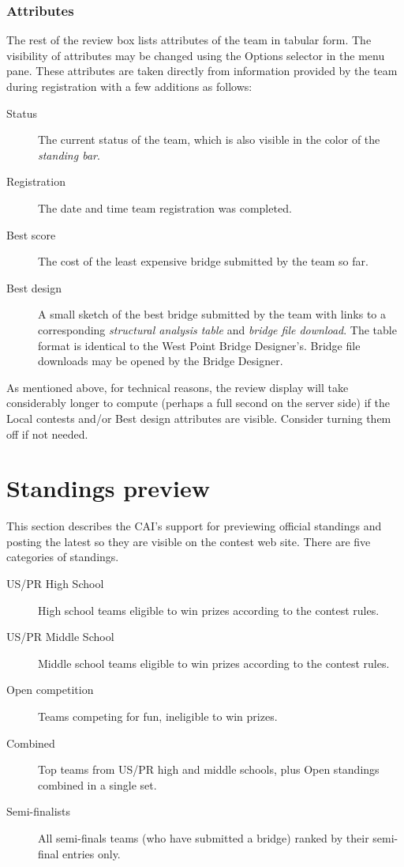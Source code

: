 \documentclass[11pt,letterpaper]{refart}
\def\ui#1{\textsf{#1}}
\begin{document}
\subsubsection{Attributes}
\label{sec:review_box_attributes}
The rest of the review box lists attributes of the team in tabular
form. The visibility of attributes may be changed using the
\ui{Options} selector in the menu pane. These attributes are taken
directly from information provided by the team during registration
with a few additions as follows:
\begin{description}
\item[Status] The current status of the team, which is also visible in
  the color of the \emph{standing bar}.
\item[Registration] The date and time team registration was completed.
\item[Best score] The cost of the least expensive bridge submitted by
  the team so far.
\item[Best design] A small sketch of the best bridge submitted by the
  team with links to a corresponding \emph{structural analysis table}
  and \emph{bridge file download}.  The table format is identical to
  the West Point Bridge Designer's. Bridge file downloads may be
  opened by the Bridge Designer.
\end{description}
As mentioned above, for technical reasons, the review display will
take considerably longer to compute (perhaps a full second on the
server side) if the \ui{Local contests} and/or \ui{Best design}
attributes are visible. Consider turning them off if not needed.

\section{Standings preview}
This section describes the CAI's support for previewing official
standings and posting the latest so they are visible on the contest
web site. There are five categories of standings.
\begin{description}
\item[US/PR High School] High school teams eligible to win prizes
  according to the contest rules.
\item[US/PR Middle School] Middle school teams eligible to win prizes
  according to the contest rules.
\item[Open competition] Teams competing for fun, ineligible to win
  prizes.
\item[Combined] Top teams from US/PR high and middle schools, plus
  Open standings combined in a single set.
\item[Semi-finalists] All semi-finals teams (who have submitted a
  bridge) ranked by their semi-final entries only.
\end{description}
\end{document}
